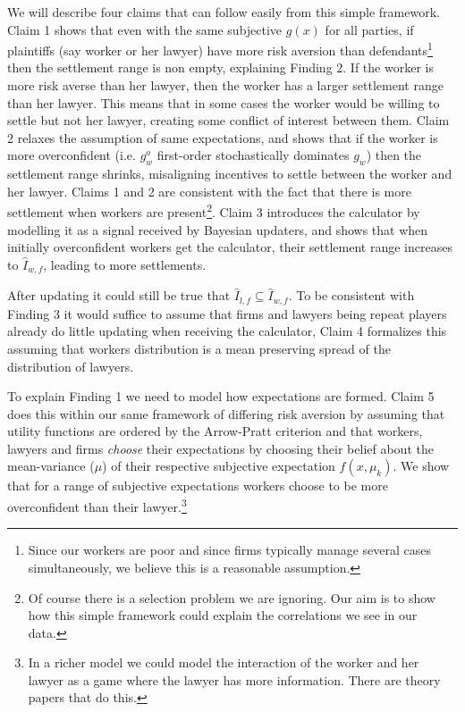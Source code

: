 \documentclass[10pt]{article}
\begin{document}
We will describe four claims that can follow easily from this simple framework. Claim 1 shows that even with the same subjective $g(x)$ for all parties, if plaintiffs (say worker or her lawyer) have more risk aversion than defendants\footnote{Since our workers are poor and since firms typically manage several cases simultaneously, we believe this is a reasonable assumption.} then the settlement range is non empty, explaining Finding 2. If the worker is more risk averse than her lawyer, then the worker has a larger settlement range than her lawyer. This means that in some cases the worker would be willing to settle but not her lawyer, creating some conflict of interest between them. Claim 2 relaxes the assumption of same expectations, and shows that if the worker is more overconfident (i.e. $g_w^o$ first-order stochastically dominates $g_w$) then the settlement range shrinks, misaligning incentives to settle between the worker and her lawyer. Claims 1 and 2 are consistent with the fact that there is more settlement when workers are present\footnote{Of course there is a selection problem we are ignoring. Our aim is to show how this simple framework could explain the correlations we see in our data.}. Claim 3 introduces the calculator by modelling it as a signal received by Bayesian updaters, and shows that when initially overconfident workers get the calculator, their settlement range increases to $\hat{I}_{w,f}$, leading to more settlements.

After updating it could still be true that $\hat{I}_{l,f}\subseteq \hat{I}_{w,f}$. To be consistent with Finding 3 it would suffice to assume that firms and lawyers being repeat players already do little updating when receiving the calculator, Claim 4 formalizes this assuming that workers distribution is a mean preserving spread of the distribution of lawyers.

To explain Finding 1 we need to model how expectations are formed. Claim 5 does this within our same framework of differing risk aversion by assuming that utility functions are ordered by the Arrow-Pratt criterion and that workers, lawyers and firms \textit{choose} their expectations by choosing their belief about the mean-variance ($\mu$) of their respective subjective expectation $f(x,\mu_k)$. We show that for a range of subjective expectations workers choose to be more overconfident than their lawyer.\footnote{In a richer model we could model the interaction of the worker and her lawyer as a game where the lawyer has more information. There are theory papers that do this.}
\end{document}
